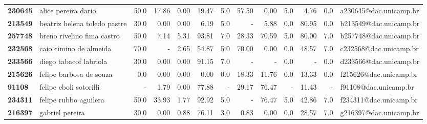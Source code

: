 \documentclass[11pt]{article}
\begin{document}
\begin{longtable}{llrrrrrrrrrrl}
\bottomrule
\endlastfoot
\textbf{230645} &                    alice pereira dario &                  50.0 &       17.86 &        0.00 &       19.47 &                      5.0 &       57.50 &        0.00 &                        5.0 &        4.76 &                      0.0 &  a230645@dac.unicamp.br \\
\textbf{213549} &           beatriz helena toledo pastre &                  30.0 &        0.00 &        0.00 &        6.19 &                      5.0 &           - &        5.88 &                        0.0 &       80.95 &                      0.0 &  b213549@dac.unicamp.br \\
\textbf{257748} &             breno rivelino fima castro &                  50.0 &        7.14 &        5.31 &       93.81 &                      7.0 &       28.33 &       70.59 &                        5.0 &       80.00 &                      7.0 &  b257748@dac.unicamp.br \\
\textbf{232568} &                 caio cimino de almeida &                  70.0 &           - &        2.65 &       54.87 &                      5.0 &       70.00 &        0.00 &                        0.0 &       48.57 &                      7.0 &  c232568@dac.unicamp.br \\
\textbf{233566} &                 diego tabacof labriola &                  30.0 &        0.00 &        0.00 &       91.15 &                      7.0 &           - &           - &                        0.0 &           - &                      0.0 &  d233566@dac.unicamp.br \\
\textbf{215626} &                felipe barbosa de souza &                   0.0 &        0.00 &        0.00 &        0.00 &                      0.0 &       18.33 &       11.76 &                        0.0 &       13.33 &                      0.0 &  f215626@dac.unicamp.br \\
\textbf{91108 } &                 felipe eboli sotorilli &                     - &        1.79 &        0.00 &       77.88 &                        - &       29.17 &       76.47 &                          - &       11.43 &                        - &   f91108@dac.unicamp.br \\
\textbf{234311} &                  felipe rubbo aguilera &                  50.0 &       33.93 &        1.77 &       92.92 &                      5.0 &           - &       76.47 &                        5.0 &       42.86 &                      7.0 &  f234311@dac.unicamp.br \\
\textbf{216397} &                        gabriel pereira &                  30.0 &        0.00 &        0.88 &       76.11 &                      3.0 &        0.83 &        0.00 &                        0.0 &       28.57 &                      7.0 &  g216397@dac.unicamp.br \\

\end{longtable}
\end{document}
